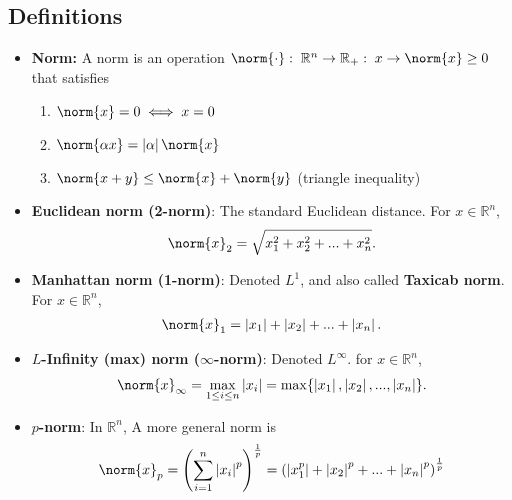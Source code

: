 \documentclass{report}
\begin{document}
    \subsection{Definitions}
    \begin{itemize}
        \item \textbf{Norm:} A norm is an operation $\norm{\cdot }:\; \mathbb{R}^{n} \to \mathbb{R}_{+}:\; x \to \norm{x} \geq 0$  that satisfies
            \begin{enumerate}
                \item $\norm{x} = 0 \iff x = 0$
                \item $\norm{\alpha x} = \left\lvert \alpha \right\rvert \norm{x} $
                \item $\norm{x+y} \leq \norm{x} + \norm{y} $ (triangle inequality)
            \end{enumerate}
        \item \textbf{Euclidean norm (2-norm)}: The standard Euclidean distance. For $x \in \mathbb{R}^{n}$,
            \begin{align*}
                \norm{x}_{2} = \sqrt{x_{1}^{2} + x_{2}^{2} + ... + x_{n}^{2}}
            .\end{align*}
        \item \textbf{Manhattan norm (1-norm)}: Denoted $L^{1} $, and also called \textbf{Taxicab norm}. For $x \in \mathbb{R}^{n} $,
            \begin{align*}
                \norm{x}_{1} = \left\lvert x_{1} \right\rvert + \left\lvert x_{2} \right\rvert + ... + \left\lvert x_{n} \right\rvert
            .\end{align*}
        \item \textbf{$L$-Infinity (max) norm ($\infty$-norm)}: Denoted $L^{\infty}$. for $x\in \mathbb{R}^{n}$,
            \begin{align*}
                \norm{x}_{\infty} = \max_{1 \leq i \leq n} \left\lvert x_{i} \right\rvert = \max\{\left\lvert x_{1} \right\rvert, \left\lvert x_{2} \right\rvert, ..., \left\lvert x_{n} \right\rvert\} 
            .\end{align*}
        \item \textbf{$p$-norm}: In $\mathbb{R}^{n}$, A more general norm is
            \begin{align*}
                \norm{x}_{p} = \left(\sum_{i=1}^{n} \left\lvert x_{i} \right\rvert^{p}\right)^{\frac{1}{p}} = \left(\left\lvert x_{1}^{p} \right\rvert + \left\lvert x_{2} \right\rvert^{p} + ... + \left\lvert x_{n} \right\rvert^{p}\right)^{\frac{1}{p}}

\end{align*}
\end{itemize}
\end{document}
